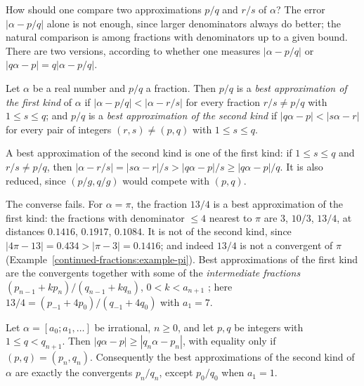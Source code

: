 How should one compare two approximations $p/q$ and $r/s$ of $\alpha$? The error $|\alpha - p/q|$ alone is not enough, since larger denominators always do better; the natural comparison is
among fractions with denominators up to a given bound. There are two versions, according to whether one measures $|\alpha - p/q|$ or $|q\alpha - p| = q|\alpha - p/q|$.

\begin{definition}\label{continued-fractions:definition-best}
Let $\alpha$ be a real number and $p/q$ a fraction. Then $p/q$ is a \emph{best approximation of the first kind} of $\alpha$ if $|\alpha - p/q| < |\alpha - r/s|$ for every fraction $r/s \neq p/q$
with $1 \leq s \leq q$; and $p/q$ is a \emph{best approximation of the second kind} if $|q\alpha - p| < |s\alpha - r|$ for every pair of integers $(r, s) \neq (p, q)$ with $1 \leq s \leq q$.
\end{definition}

A best approximation of the second kind is one of the first kind: if $1 \leq s \leq q$ and $r/s \neq p/q$, then $|\alpha - r/s| = |s\alpha - r|/s > |q\alpha - p|/s \geq |q\alpha - p|/q$. It is
also reduced, since $(p/g, q/g)$ would compete with $(p, q)$.

\begin{example}\label{continued-fractions:example-first-kind}
The converse fails. For $\alpha = \pi$, the fraction $13/4$ is a best approximation of the first kind: the fractions with denominator $\leq 4$ nearest to $\pi$ are $3$, $10/3$, $13/4$, at distances
$0.1416$, $0.1917$, $0.1084$. It is not of the second kind, since $|4\pi - 13| = 0.434 > |\pi - 3| = 0.1416$; and indeed $13/4$ is not a convergent of $\pi$
(Example~\ref{continued-fractions:example-pi}). Best approximations of the first kind are the convergents together with some of the \emph{intermediate fractions}
$(p_{n-1} + kp_n)/(q_{n-1} + kq_n)$, $0 < k < a_{n+1}$ \cite{khinchin-continued-fractions}; here $13/4 = (p_{-1} + 4p_0)/(q_{-1} + 4q_0)$ with $a_1 = 7$.
\end{example}

\begin{theorem}[Lagrange]\label{continued-fractions:theorem-best}
Let $\alpha = [a_0; a_1, \ldots]$ be irrational, $n \geq 0$, and let $p, q$ be integers with $1 \leq q < q_{n+1}$. Then $|q\alpha - p| \geq |q_n\alpha - p_n|$, with equality only if
$(p, q) = (p_n, q_n)$. Consequently the best approximations of the second kind of $\alpha$ are exactly the convergents $p_n/q_n$, except $p_0/q_0$ when $a_1 = 1$.
\end{theorem}

